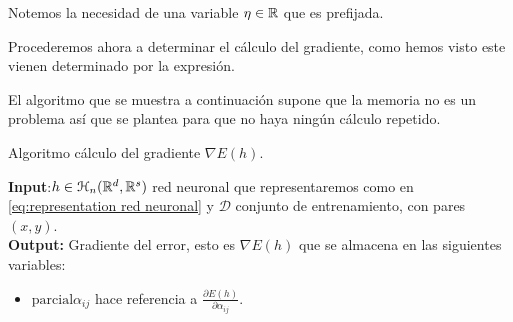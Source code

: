 Notemos la necesidad de una variable $\eta \in \mathbb{R}$ que es prefijada. 

Procederemos ahora a determinar el cálculo del gradiente, como hemos visto este vienen determinado por la expresión. 

El algoritmo que se muestra a continuación supone que la memoria no es un problema así que se plantea para que no haya ningún cálculo repetido. 


\begin{algorithm}[H] \label{algoritmo:calculo-gradiente}
    \caption{Algoritmo cálculo del gradiente $\nabla E(h)$.}
    \hspace*{\algorithmicindent} \textbf{Input}:$h \in  \mathcal{H}_n(\mathbb{R}^d,\mathbb{R}^s)$ red neuronal que representaremos como en \ref{eq:representation red neuronal} y $\mathcal{D}$ conjunto de entrenamiento, con pares $(x, y)$. \\
    \hspace*{\algorithmicindent} \textbf{Output:} Gradiente del error, esto es $\nabla E(h)$ que se almacena en las siguientes variables: 
    \begin{itemize}
        \item $\text{parcial} \alpha_{i j}$ hace referencia a $\frac{\partial E(h)}{\partial \alpha_{i j}}$. 
   

\end{itemize}
\end{algorithm}
